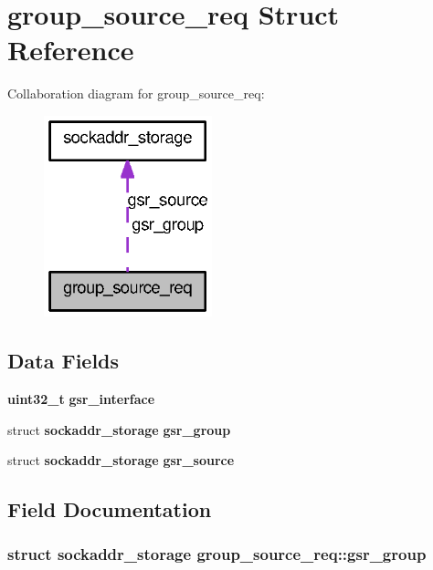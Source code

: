 \section{group\_\-source\_\-req Struct Reference}
\label{structgroup__source__req}


Collaboration diagram for group\_\-source\_\-req:
\nopagebreak
\begin{figure}[H]
\begin{center}
\leavevmode
\includegraphics[width=138pt]{structgroup__source__req__coll__graph}
\end{center}
\end{figure}
\subsection*{Data Fields}
\begin{DoxyCompactItemize}
\item 
{\bf uint32\_\-t} {\bf gsr\_\-interface}
\item 
struct {\bf sockaddr\_\-storage} {\bf gsr\_\-group}
\item 
struct {\bf sockaddr\_\-storage} {\bf gsr\_\-source}
\end{DoxyCompactItemize}


\subsection{Field Documentation}
\subsubsection[{gsr\_\-group}]{\setlength{\rightskip}{0pt plus 5cm}struct {\bf sockaddr\_\-storage} {\bf group\_\-source\_\-req::gsr\_\-group}}\label{structgroup__source__req_a6d7738414c711bc099c805a902cc5951}
